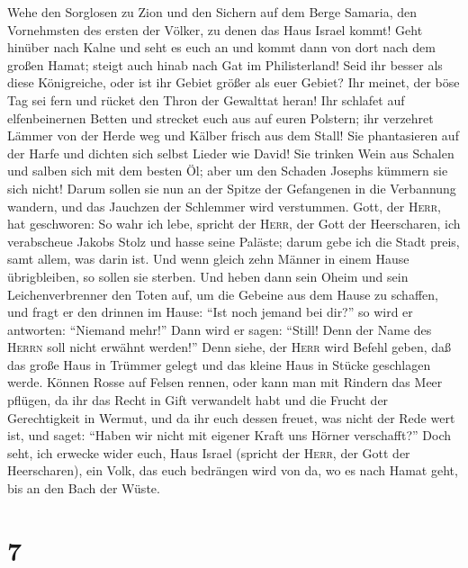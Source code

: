  Wehe den Sorglosen zu Zion und den Sichern auf dem Berge
Samaria, den Vornehmsten des ersten der Völker, zu denen das Haus Israel
kommt!  Geht hinüber nach Kalne und seht es euch an und
kommt dann von dort nach dem großen Hamat; steigt auch hinab nach Gat im
Philisterland! Seid ihr besser als diese Königreiche, oder ist ihr
Gebiet größer als euer Gebiet?  Ihr meinet, der böse Tag
sei fern und rücket den Thron der Gewalttat heran!  Ihr
schlafet auf elfenbeinernen Betten und strecket euch aus auf euren
Polstern; ihr verzehret Lämmer von der Herde weg und Kälber frisch aus
dem Stall!  Sie phantasieren auf der Harfe und dichten
sich selbst Lieder wie David!  Sie trinken Wein aus
Schalen und salben sich mit dem besten Öl; aber um den Schaden Josephs
kümmern sie sich nicht!  Darum sollen sie nun an der
Spitze der Gefangenen in die Verbannung wandern, und das Jauchzen der
Schlemmer wird verstummen.  Gott, der \textsc{Herr}, hat
geschworen: So wahr ich lebe, spricht der \textsc{Herr}, der Gott der
Heerscharen, ich verabscheue Jakobs Stolz und hasse seine Paläste; darum
gebe ich die Stadt preis, samt allem, was darin ist.  Und
wenn gleich zehn Männer in einem Hause übrigbleiben, so sollen sie
sterben.  Und heben dann sein Oheim und sein
Leichenverbrenner den Toten auf, um die Gebeine aus dem Hause zu
schaffen, und fragt er den drinnen im Hause: ``Ist noch jemand bei
dir?'' so wird er antworten: ``Niemand mehr!'' Dann wird er sagen:
``Still! Denn der Name des \textsc{Herrn} soll nicht erwähnt werden!''
 Denn siehe, der \textsc{Herr} wird Befehl geben, daß das
große Haus in Trümmer gelegt und das kleine Haus in Stücke geschlagen
werde.  Können Rosse auf Felsen rennen, oder kann man mit
Rindern das Meer pflügen, da ihr das Recht in Gift verwandelt habt und
die Frucht der Gerechtigkeit in Wermut,  und da ihr euch
dessen freuet, was nicht der Rede wert ist, und saget: ``Haben wir nicht
mit eigener Kraft uns Hörner verschafft?''  Doch seht,
ich erwecke wider euch, Haus Israel (spricht der \textsc{Herr}, der Gott
der Heerscharen), ein Volk, das euch bedrängen wird von da, wo es nach
Hamat geht, bis an den Bach der Wüste.

\hypertarget{section-6}{%
\section{7}\label{section-6}}

